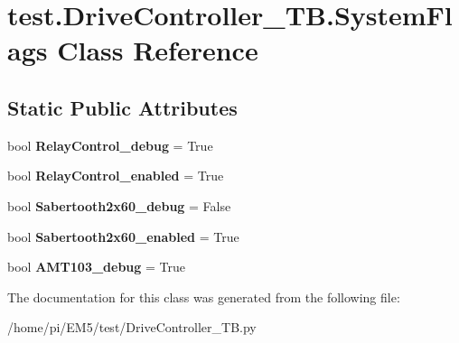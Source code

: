\hypertarget{classtest_1_1DriveController__TB_1_1SystemFlags}{}\section{test.\+Drive\+Controller\+\_\+\+T\+B.\+System\+Flags Class Reference}
\label{classtest_1_1DriveController__TB_1_1SystemFlags}
\subsection*{Static Public Attributes}
\begin{DoxyCompactItemize}
\item 
\mbox{\label{classtest_1_1DriveController__TB_1_1SystemFlags_a273b2d06664ff1ef9cf7fa0d4ebf2b53}} 
bool {\bfseries Relay\+Control\+\_\+debug} = True
\item 
\mbox{\label{classtest_1_1DriveController__TB_1_1SystemFlags_ae514e18ce03e33496fa3da7628f97401}} 
bool {\bfseries Relay\+Control\+\_\+enabled} = True
\item 
\mbox{\label{classtest_1_1DriveController__TB_1_1SystemFlags_a84f3e7521d103b4da7c944a052823cf9}} 
bool {\bfseries Sabertooth2x60\+\_\+debug} = False
\item 
\mbox{\label{classtest_1_1DriveController__TB_1_1SystemFlags_a0be042aaa8090e606ea7526c45bd706f}} 
bool {\bfseries Sabertooth2x60\+\_\+enabled} = True
\item 
\mbox{\label{classtest_1_1DriveController__TB_1_1SystemFlags_af37448b4ed18d8c9b3fbbc004db8effc}} 
bool {\bfseries A\+M\+T103\+\_\+debug} = True
\end{DoxyCompactItemize}


The documentation for this class was generated from the following file\+:\begin{DoxyCompactItemize}
\item 
/home/pi/\+E\+M5/test/Drive\+Controller\+\_\+\+T\+B.\+py\end{DoxyCompactItemize}
